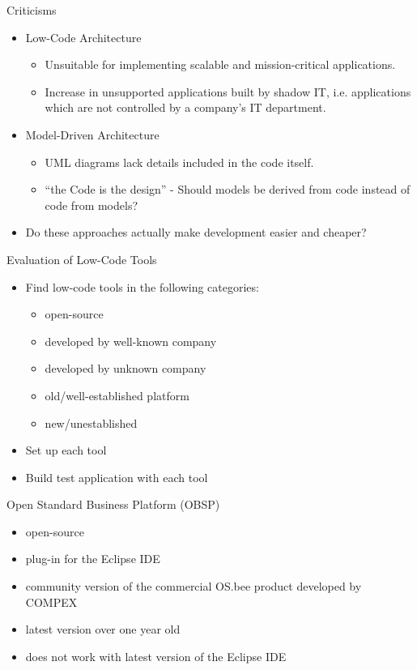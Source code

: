 \documentclass[aspectratio=169]{beamer}
\begin{document}
  \begin{frame}{Criticisms}
    \begin{itemize}
      \item Low-Code Architecture
        \begin{itemize}
          \item Unsuitable for implementing scalable and mission-critical applications.
          \item Increase in unsupported applications built by shadow IT,
                i.e. applications which are not controlled by a company's IT department.
        \end{itemize}
      \item Model-Driven Architecture
        \begin{itemize}
          \item UML diagrams lack details included in the code itself.
          \item “the Code is the design” - Should models be derived from code instead of code from models?
        \end{itemize}
      \item Do these approaches actually make development easier and cheaper?
    \end{itemize}
  \end{frame}

  \begin{frame}{Evaluation of Low-Code Tools}
    \begin{itemize}
      \item Find low-code tools in the following categories:
          \begin{itemize}
            \item open-source
            \item developed by well-known company
            \item developed by unknown company
            \item old/well-established platform
            \item new/unestablished
          \end{itemize}
      \item Set up each tool
      \item Build test application with each tool
    \end{itemize}
  \end{frame}

  \begin{frame}{Open Standard Business Platform (OBSP)}
    \begin{itemize}
      \item open-source
      \item plug-in for the Eclipse IDE
      \item community version of the commercial OS.bee product developed by COMPEX
      \item latest version over one year old
      \item does not work with latest version of the Eclipse IDE
    \end{itemize}
  \end{frame}
\end{document}
